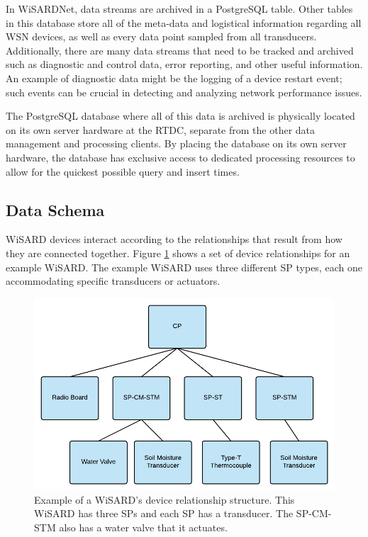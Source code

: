 In WiSARDNet, data streams are archived in a PostgreSQL table. Other tables in this database store all of the meta-data and logistical information regarding all WSN devices, as well as every data point sampled from all transducers. Additionally, there are many data streams that need to be tracked and archived such as diagnostic and control data, error reporting, and other useful information. An example of diagnostic data might be the logging of a device restart event; such events can be crucial in detecting and analyzing network performance issues.

The PostgreSQL database where all of this data is archived is physically located on its own server hardware at the RTDC, separate from the other data management and processing clients. By placing the database on its own server hardware, the database has exclusive access to dedicated processing resources to allow for the quickest possible query and insert times. 

\subsection{Data Schema}
WiSARD devices interact according to the relationships that result from how they are connected together. Figure \ref{fig:device_hierarchy_edit} shows a set of device relationships for an example WiSARD. The example WiSARD uses three different SP types, each one accommodating specific transducers or actuators. 

\begin{figure}[H]
	\centering
	\includegraphics[width=\textwidth]{figures/wisard_device_hierarchy.png}
	\caption{Example of a WiSARD's device relationship structure. This WiSARD has three SPs and each SP has a transducer. The SP-CM-STM also has a water valve that it actuates.}
	\label{fig:device_hierarchy_edit}
\end{figure}

